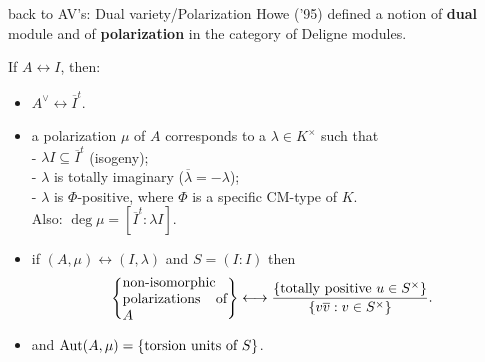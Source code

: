 \documentclass{beamer}
\begin{document}
% 

\begin{frame}{ back to AV's: Dual variety/Polarization }
Howe ('95) defined a notion of \textbf{dual} module and of \textbf{polarization} in the category of Deligne modules.
\begin{theorem}[M.]
   If $A\leftrightarrow I$, then:
   \begin{itemize}
      \pause \item $A^\vee \leftrightarrow \overline{I}^t$.
      \pause \item a polarization $\mu$ of $A$ corresponds to a $\lambda\in K^\times$ such that\\
	    - $\lambda I \subseteq \overline{I}^t$ (isogeny);\\
	    - $\lambda$ is totally imaginary ($\overline \lambda = -\lambda$);\\
	    - $\lambda$ is $\Phi$-positive, where $\Phi$ is a specific CM-type of $K$.\\ 
      Also: $\deg \mu= [\overline{I}^t : \lambda I]$.
      \pause  \item if $(A,\mu) \leftrightarrow (I,\lambda)$ and $S=(I:I)$ then
     \vspace{-0.5em}
	      \[\set{\parbox[p]{7.5em}{non-isomorphic polarizations of $A$}} \longleftrightarrow \dfrac{\set{\text{totally positive }u\in S^\times }}{\set{v\overline{v}: v\in S^\times}}.\]
     \vspace{-1em}
	 \pause \item  and $\operatorname{Aut}(A,\mu) = \left\lbrace\text{torsion units of $S$}\right\rbrace$.
\end{itemize}
\end{theorem}
\end{frame}
\end{document}
